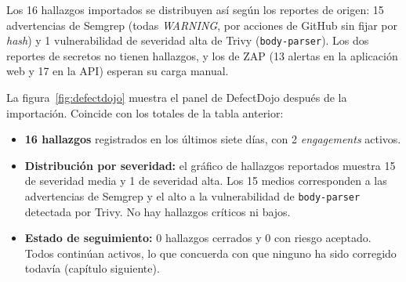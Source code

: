 Los 16 hallazgos importados se distribuyen así según los reportes de origen:
15 advertencias de Semgrep (todas \textit{WARNING}, por acciones de GitHub sin
fijar por \textit{hash}) y 1 vulnerabilidad de severidad alta de Trivy
(\texttt{body-parser}). Los dos reportes de secretos no tienen hallazgos, y
los de ZAP (13 alertas en la aplicación web y 17 en la API) esperan su carga
manual.

La figura~\ref{fig:defectdojo} muestra el panel de DefectDojo después de la
importación. Coincide con los totales de la tabla anterior:

\begin{itemize}
    \item \textbf{16 hallazgos} registrados en los últimos siete días, con
    2 \textit{engagements} activos.
    \item \textbf{Distribución por severidad:} el gráfico de hallazgos
    reportados muestra 15 de severidad media y 1 de severidad alta. Los 15
    medios corresponden a las advertencias de Semgrep y el alto a la
    vulnerabilidad de \texttt{body-parser} detectada por Trivy. No hay
    hallazgos críticos ni bajos.
    \item \textbf{Estado de seguimiento:} 0 hallazgos cerrados y 0 con
    riesgo aceptado. Todos continúan activos, lo que concuerda con que
    ninguno ha sido corregido todavía (capítulo siguiente).
\end{itemize}
